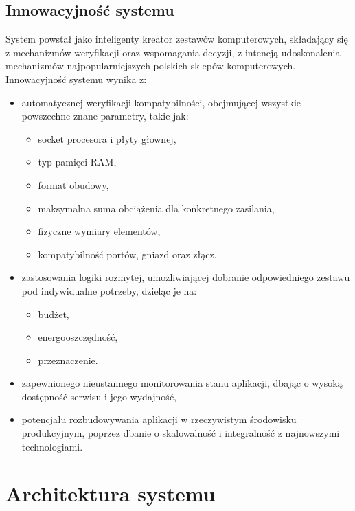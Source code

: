 \documentclass[a4paper,twoside,12pt]{book}
\begin{document}
\subsection{Innowacyjność systemu}
System powstał jako inteligenty kreator zestawów komputerowych, składający się z mechanizmów weryfikacji oraz wspomagania decyzji, z intencją udoskonalenia mechanizmów najpopularniejszych polskich sklepów komputerowych. \\
Innowacyjność systemu wynika z:
\begin{itemize}
    \item automatycznej weryfikacji kompatybilności, obejmującej wszystkie powszechne znane parametry, takie jak:
    \begin{itemize}
        \item socket procesora i płyty głownej,
        \item typ pamięci RAM,
        \item format obudowy,
        \item maksymalna suma obciążenia dla konkretnego zasilania,
        \item fizyczne wymiary elementów,
        \item kompatybilność portów, gniazd oraz złącz.
    \end{itemize}
    \item zastosowania logiki rozmytej, umożliwiającej dobranie odpowiedniego zestawu pod indywidualne potrzeby, dzieląc je na:
    \begin{itemize}
        \item budżet,
        \item energooszczędność,
        \item przeznaczenie.
    \end{itemize}
    \item zapewnionego nieustannego monitorowania stanu aplikacji, dbając o wysoką dostępność serwisu i jego wydajność,
    \item potencjału rozbudowywania aplikacji w rzeczywistym środowisku produkcyjnym, poprzez dbanie o skalowalność i integralność z najnowszymi technologiami.
\end{itemize}


\section{Architektura systemu}
\end{document}

